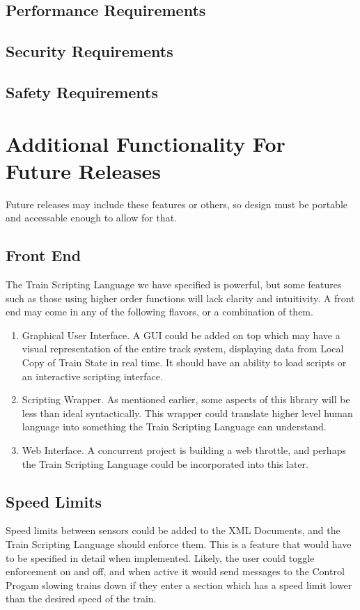 \documentclass[a4paper,11pt,notitlepage]{article}
\def\TSL{Train Scripting Language\xspace}
\def\CS{Control Progam\xspace} \def\LC{Local Copy of Train State\xspace} \def\TN{Track Node\xspace}
\begin{document}
\subsection{Performance Requirements}
\subsection{Security Requirements}
\subsection{Safety Requirements}

\newpage
\section{Additional Functionality For Future Releases}
Future releases may include these features or others, so design must be portable and accessable enough to allow for that.
\subsection{Front End}
The \TSL we have specified is powerful, but some features such as those using higher order functions will lack clarity and intuitivity. A front end may come in any of the following flavors, or a combination of them.
\begin{enumerate}
	\item Graphical User Interface. A GUI could be added on top which may have a visual representation of the entire track system, displaying data from \LC in real time. It should have an ability to load scripts or an interactive scripting interface.
	\item Scripting Wrapper. As mentioned earlier, some aspects of this library will be less than ideal syntactically. This wrapper could translate higher level human language into something the \TSL can understand.
	\item Web Interface. A concurrent project is building a web throttle, and perhaps the \TSL could be incorporated into this later.
\end{enumerate}
\subsection{Speed Limits}
Speed limits between sensors could be added to the XML Documents, and the \TSL should enforce them. This is a feature that would have to be specified in detail when implemented. Likely, the user could toggle enforcement on and off, and when active it would send messages to the \CS slowing trains down if they enter a section which has a speed limit lower than the desired speed of the train.
\end{document}
